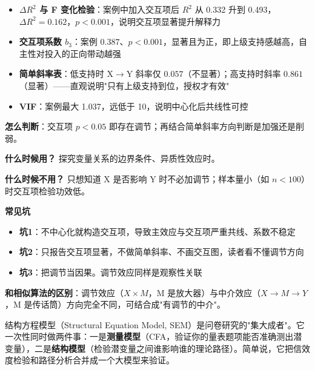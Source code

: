 \begin{algoresult}
\begin{itemize}
    \item \textbf{$\Delta R^2$ 与 F 变化检验}：案例中加入交互项后 $R^2$ 从 0.332 升到 0.493，$\Delta R^2=0.162$，$p<0.001$，说明交互项显著提升解释力
    \item \textbf{交互项系数 $b_3$}：案例 $0.387$、$p<0.001$，显著且为正，即上级支持感越高，自主性对投入的正向带动越强
    \item \textbf{简单斜率表}：低支持时 X$\to$Y 斜率仅 $0.057$（不显著）；高支持时斜率 $0.861$（显著）——直观说明"只有上级支持到位，授权才有效"
    \item \textbf{VIF}：案例最大 1.037，远低于 10，说明中心化后共线性可控
\end{itemize}

\textbf{怎么判断}：交互项 $p<0.05$ 即存在调节；再结合简单斜率方向判断是加强还是削弱。
\end{algoresult}

\begin{algonotes}
\textbf{什么时候用？} 探究变量关系的边界条件、异质性效应时。

\textbf{什么时候不用？} 只想知道 X 是否影响 Y 时不必加调节；样本量小（如 $n<100$）时交互项检验功效低。

\textbf{常见坑}
\begin{itemize}
    \item \textbf{坑1}：不中心化就构造交互项，导致主效应与交互项严重共线、系数不稳定
    \item \textbf{坑2}：只报告交互项显著，不做简单斜率、不画交互图，读者看不懂调节方向
    \item \textbf{坑3}：把调节当因果。调节效应同样是观察性关联
\end{itemize}

\textbf{和相似算法的区别}：调节效应（$X \times M$，M 是放大器）与中介效应（$X \to M \to Y$，M 是传话筒）方向完全不同，可结合成"有调节的中介"。
\end{algonotes}


\begin{algointro}
结构方程模型（Structural Equation Model, SEM）是问卷研究的"集大成者"。它一次性同时做两件事：一是\textbf{测量模型}（CFA，验证你的量表题项能否准确测出潜变量），二是\textbf{结构模型}（检验潜变量之间谁影响谁的理论路径）。简单说，它把信效度检验和路径分析合并成一个大模型来验证。
\end{algointro}

